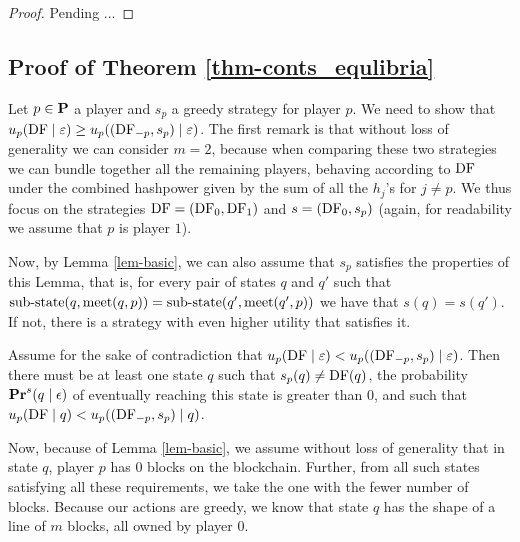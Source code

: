 \begin{proof} Pending ...

%
\end{proof}





\subsection{Proof of Theorem \ref{thm-conts_equlibria}} 

Let $p \in \mathbf{P}$ a player and $s_p$ a greedy strategy for player $p$. We need to show that 
$u_p(\text{\rm DF} \mid \varepsilon) \geq u_p( (\text{\rm DF}_{-p},s_p) \mid \varepsilon)$. The first remark is that without loss of generality we can consider 
$m = 2$, because when comparing these two strategies we can bundle together all the remaining players, behaving according to $\text{\rm DF}$ 
under the combined hashpower given by the sum of all the $h_j$'s for $j \neq p$. We thus focus on the strategies 
$\text{\rm DF} = (\text{\rm DF}_0,\text{\rm DF}_1)$ and $s = (\text{\rm DF}_0,s_p)$ (again, for readability we assume that $p$ is player $1$). 

Now, by Lemma \ref{lem-basic}, we can also assume that $s_p$ satisfies the properties of this Lemma, that is, for every 
pair of states $q$ and $q'$ such that ${\text{\rm sub-state}}(q,\text{\rm meet}(q,p)) = {\text{\rm sub-state}}(q',\text{\rm meet}(q',p))$ we have that $s(q) = s(q')$. If not, there is a strategy with even higher utility that satisfies it. 

Assume for the sake of contradiction that $u_p(\text{\rm DF} \mid \varepsilon) < u_p( (\text{\rm DF}_{-p},s_p) \mid \varepsilon)$. Then there must be at least one 
state $q$ such that $s_p(q) \neq \text{\rm DF}(q)$, the probability $\mathbf{Pr}^s(q \mid \epsilon)$ of eventually reaching this state is greater than $0$, and such that $u_p(\text{\rm DF} \mid q) < u_p( (\text{\rm DF}_{-p},s_p) \mid q)$. 


Now, because of Lemma \ref{lem-basic}, we assume without loss of generality that in state $q$, player $p$ has $0$ blocks on the blockchain. Further, from all such states satisfying all these requirements, we take the one with the fewer number of blocks. Because our actions are greedy, we know that state $q$ has the shape of a line of $m$ blocks, all owned by player $0$. 


